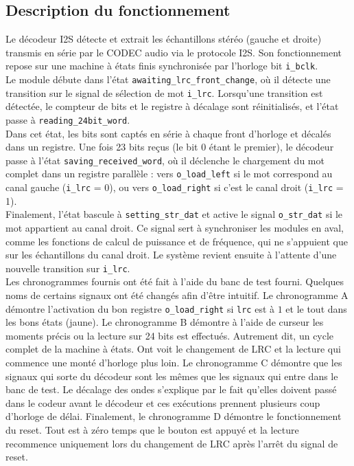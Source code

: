 

\subsection{Description du fonctionnement}

Le décodeur I2S détecte et extrait les échantillons stéréo (gauche et droite)
transmis en série par le CODEC audio via le protocole I2S. Son
fonctionnement repose sur une machine à états finis synchronisée par
l'horloge bit \verb|i_bclk|.\\

Le module débute dans l'état \verb|awaiting_lrc_front_change|, où il détecte
une transition sur le signal de sélection de mot \verb|i_lrc|. Lorsqu'une transition
est détectée, le compteur de bits et le registre à décalage sont réinitialisés,
et l'état passe à \verb|reading_24bit_word|.\\

Dans cet état, les bits sont captés en série à chaque front d'horloge et
décalés dans un registre. Une fois 23 bits reçus (le bit 0 étant le premier),
le décodeur passe à l'état \verb|saving_received_word|, où il déclenche le chargement
du mot complet dans un registre parallèle : vers \verb|o_load_left| si le mot
correspond au canal gauche (\verb|i_lrc| = 0), ou vers \verb|o_load_right| si
c'est le canal droit (\verb|i_lrc| = 1).\\

Finalement, l'état bascule à \verb|setting_str_dat| et active le signal \verb|o_str_dat| si le mot
appartient au canal droit. Ce signal sert à synchroniser les modules en aval,
comme les fonctions de calcul de puissance et de fréquence, qui ne s'appuient
que sur les échantillons du canal droit. Le système revient ensuite à l'attente
d'une nouvelle transition sur \verb|i_lrc|.\\

Les chronogrammes fournis ont été fait à l'aide du banc de test fourni. Quelques noms de certains signaux ont été changés afin d'être intuitif. Le chronogramme A démontre l'activation du bon registre \verb|o_load_right| si \verb|lrc| est à $1$ et le tout dans les bons états (jaune). Le chronogramme B démontre à l'aide de curseur les moments précis ou la lecture sur 24 bits est effectués. Autrement dit, un cycle complet de la machine à états. Ont voit le changement de LRC et la lecture qui commence une monté d'horloge plus loin. Le chronogramme C démontre que les signaux qui sorte du décodeur sont les mêmes que les signaux qui entre dans le banc de test. Le décalage des ondes s'explique par le fait qu'elles doivent passé dans le codeur avant le décodeur et ces exécutions prennent plusieurs coup d'horloge de délai. Finalement, le chronogramme D démontre le fonctionnement du reset. Tout est à zéro temps que le bouton est appuyé et la lecture recommence uniquement lors du changement de LRC après l'arrêt du signal de reset.

